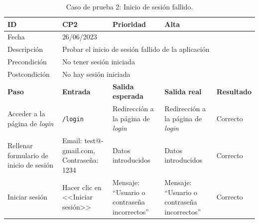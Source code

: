\begin{table}[H]
\begin{tabular}{p{} p{} p{} p{} p{}}
\cellcolor{gray!25}
ID   & CP2 & \cellcolor{gray!25} Prioridad   & Alta \\ \hline
\cellcolor{gray!25} Fecha	&	\multicolumn{4}{l}{26/06/2023} \\ \hline
\cellcolor{gray!25} Descripción		&	\multicolumn{4}{l}{Probar el inicio de sesión fallido de la aplicación} \\ \hline                                            
\cellcolor{gray!25}
Precondición  & \multicolumn{4}{l}{No tener sesión iniciada} \\ \hline
\cellcolor{gray!25} Postcondición & \multicolumn{4}{l}{No hay sesión iniciada}                                                    \\ \hline
\rowcolor{gray!25}
\textbf{Paso}   & \textbf{Entrada} & \textbf{Salida esperada} & \textbf{Salida real} & \textbf{Resultado} \\ \hline
Acceder a la página de \textit{login} 
& \texttt{/login}                                                                             
& Redirección a la página de \textit{login}                                    
& Redirección a la página de \textit{login}                                   
& Correcto                            
\\ \hline
Rellenar formulario de inicio de sesión
& Email: test@-
gmail.com, Contraseña: 1234
& Datos introducidos                               
& Datos introducidos                               
& Correcto                            
\\ \hline
Iniciar sesión
& Hacer clic en <<Iniciar sesión>>
& Mensaje: ``Usuario o contraseña incorrectos''
& Mensaje: ``Usuario o contraseña incorrectos''
& Correcto                            
\\ \hline                 
\end{tabular}
\caption{Caso de prueba 2: Inicio de sesión fallido.}
\end{table}

